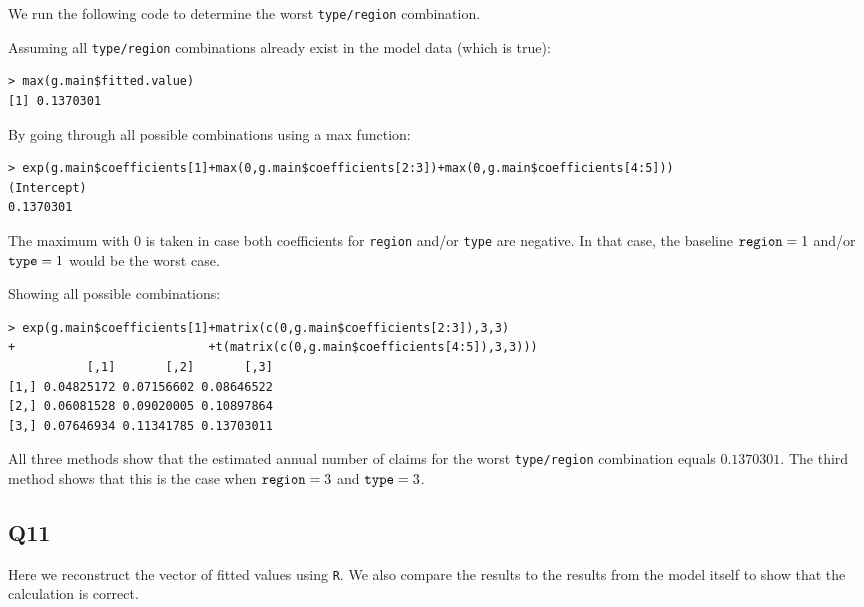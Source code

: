 \documentclass[11pt]{article}
\begin{document}
We run the following code to determine the worst \verb|type/region| combination.

Assuming all \verb|type/region| combinations already exist in the model data (which is true):
\begin{verbatim}
> max(g.main$fitted.value)
[1] 0.1370301
\end{verbatim}

By going through all possible combinations using a max function:
\begin{verbatim}
> exp(g.main$coefficients[1]+max(0,g.main$coefficients[2:3])+max(0,g.main$coefficients[4:5]))
(Intercept) 
0.1370301 
\end{verbatim}
The maximum with $0$ is taken in case both coefficients for \verb|region| and/or \verb|type| are negative. In that case, the baseline $\verb|region|=1$ and/or $\verb|type|=1$ would be the worst case.

Showing all possible combinations:
\begin{verbatim}
> exp(g.main$coefficients[1]+matrix(c(0,g.main$coefficients[2:3]),3,3)
+                           +t(matrix(c(0,g.main$coefficients[4:5]),3,3)))
           [,1]       [,2]       [,3]
[1,] 0.04825172 0.07156602 0.08646522
[2,] 0.06081528 0.09020005 0.10897864
[3,] 0.07646934 0.11341785 0.13703011
\end{verbatim}

All three methods show that the estimated annual number of claims for the worst \verb|type/region| combination equals $0.1370301$. The third method shows that this is the case when $\verb|region|=3$ and $\verb|type|=3$.

\subsection*{Q11}

Here we reconstruct the vector of fitted values using \verb|R|. We also compare the results to the results from the model itself to show that the calculation is correct.
\end{document}
